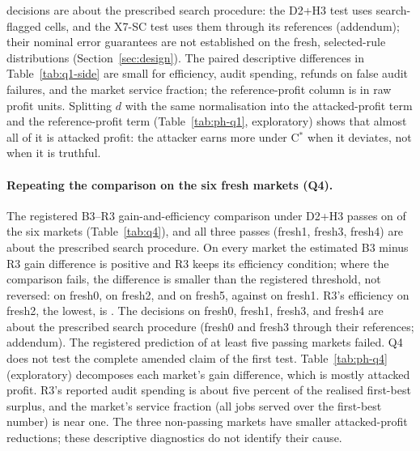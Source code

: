 \documentclass[11pt]{article}
\begin{document}
decisions are about the prescribed search procedure: the D2+H3 test uses search-flagged cells, and the X7-SC test uses them through its references (addendum); their nominal error guarantees are not established on the fresh, selected-rule distributions (Section~\ref{sec:design}). The paired descriptive differences in Table~\ref{tab:q1-side} are small for efficiency, audit spending, refunds on false audit failures, and the market service fraction; the reference-profit column is in raw profit units. Splitting $d$ with the same normalisation into the attacked-profit term and the reference-profit term (Table~\ref{tab:ph-q1}, exploratory) shows that almost all of it is attacked profit: the attacker earns more under C$^*$ when it deviates, not when it is truthful.

\begin{table}[t]\centering\small
{}
\caption{Q1: pooled difference in attacker gain, C$^*$ minus R3, per family, with interval, category, the calibrated two-sided $p$-value that enters Holm ($p'$) and its Holm-adjusted value, and efficiency label.}\label{tab:q1}
\end{table}

\paragraph{Repeating the comparison on the six fresh markets (Q4).} The registered B3--R3 gain-and-efficiency comparison under D2+H3 passes on  of the six markets (Table~\ref{tab:q4}), and all three passes (fresh1, fresh3, fresh4) are about the prescribed search procedure. On every market the estimated B3 minus R3 gain difference is positive and R3 keeps its efficiency condition; where the comparison fails, the difference is smaller than the registered threshold, not reversed:  on fresh0,  on fresh2, and  on fresh5, against  on fresh1. R3's efficiency on fresh2, the lowest, is . The decisions on fresh0, fresh1, fresh3, and fresh4 are about the prescribed search procedure (fresh0 and fresh3 through their references; addendum). The registered prediction of at least five passing markets failed. Q4 does not test the complete amended claim of the first test. Table~\ref{tab:ph-q4} (exploratory) decomposes each market's gain difference, which is mostly attacked profit. R3's reported audit spending is about five percent of the realised first-best surplus, and the market's service fraction (all jobs served over the first-best number) is near one. The three non-passing markets have smaller attacked-profit reductions; these descriptive diagnostics do not identify their cause.
\end{document}
